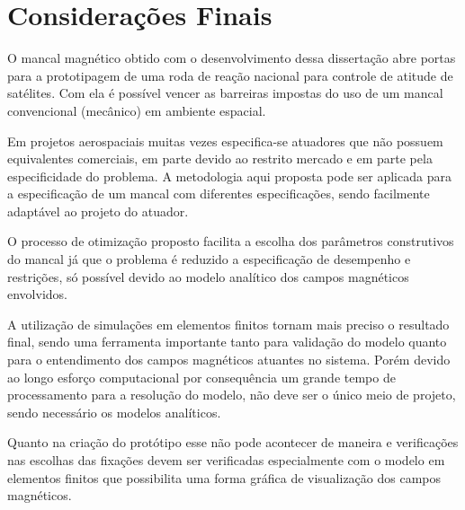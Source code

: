 \pagestyle{empty}
	\cleardoublepage
\pagestyle{fancy}

\chapter{Considerações Finais} \label{Cap:Consideracoes:Finais}


O mancal magnético obtido com o desenvolvimento dessa dissertação abre portas para a prototipagem de uma roda de reação nacional para controle de atitude de satélites. Com ela é possível vencer as barreiras impostas do uso de um mancal convencional (mecânico) em ambiente espacial.

Em projetos aerospaciais muitas vezes especifica-se atuadores que não possuem equivalentes comerciais, em parte devido ao restrito mercado e em parte pela especificidade do problema. A metodologia aqui proposta pode ser aplicada para a especificação de um mancal com diferentes especificações, sendo facilmente adaptável ao projeto do atuador.

O processo de otimização proposto facilita a escolha dos parâmetros construtivos do mancal já que o problema é reduzido a especificação de desempenho e restrições, só possível devido ao modelo analítico dos campos magnéticos envolvidos.

A utilização de simulações em elementos finitos tornam mais preciso o resultado final, sendo uma ferramenta importante tanto para validação do modelo quanto para o entendimento dos campos magnéticos atuantes no sistema. Porém devido ao longo esforço computacional por consequência um grande tempo de processamento para a resolução do modelo, não deve ser o único meio de projeto, sendo necessário os modelos analíticos.

Quanto na criação do protótipo esse não pode acontecer de maneira e verificações nas escolhas das fixações devem ser verificadas especialmente com o modelo em elementos finitos que possibilita uma forma gráfica de visualização dos campos magnéticos.  

